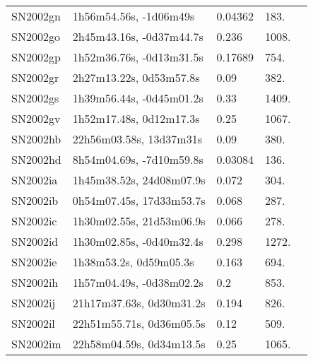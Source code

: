 \begin{longtable}{lllll}
         SN2002gn &         1h56m54.56s, -1d06m49s &  0.04362 &           183. &    \citet{2003SDSS1.C...0000:} \\
         SN2002go &       2h45m43.16s, -0d37m44.7s &    0.236 &          1008. &    \citet{2002IAUC.7994A...1M} \\
         SN2002gp &       1h52m36.76s, -0d13m31.5s &  0.17689 &           754. &    \citet{2003SDSS1.C...0000:} \\
         SN2002gr &        2h27m13.22s, 0d53m57.8s &     0.09 &           382. &    \citet{2002IAUC.7994A...1M} \\
         SN2002gs &       1h39m56.44s, -0d45m01.2s &     0.33 &          1409. &    \citet{2002IAUC.7994A...1M} \\
         SN2002gv &        1h52m17.48s, 0d12m17.3s &     0.25 &          1067. &    \citet{2002IAUC.7996C...1M} \\
         SN2002hb &        22h56m03.58s, 13d37m31s &     0.09 &           380. &    \citet{2002IAUC.8002C...1H} \\
         SN2002hd &       8h54m04.69s, -7d10m59.8s &  0.03084 &           136. &    \citet{2012ApJS..199...26H} \\
         SN2002ia &       1h45m38.52s, 24d08m07.9s &    0.072 &           304. &    \citet{2002IAUC.8027B...1H} \\
         SN2002ib &       0h54m07.45s, 17d33m53.7s &    0.068 &           287. &    \citet{2002IAUC.8027B...1H} \\
         SN2002ic &       1h30m02.55s, 21d53m06.9s &    0.066 &           278. &    \citet{2002IAUC.8028B...1H} \\
         SN2002id &       1h30m02.85s, -0d40m32.4s &    0.298 &          1272. &    \citet{2002IAUC.8020A...1M} \\
         SN2002ie &         1h38m53.2s, 0d59m05.3s &    0.163 &           694. &    \citet{2002IAUC.8020A...1M} \\
         SN2002ih &       1h57m04.49s, -0d38m02.2s &      0.2 &           853. &    \citet{2002IAUC.8020A...1M} \\
         SN2002ij &       21h17m37.63s, 0d30m31.2s &    0.194 &           826. &    \citet{2002IAUC.8020A...1M} \\
         SN2002il &       22h51m55.71s, 0d36m05.5s &     0.12 &           509. &    \citet{2002IAUC.8020A...1M} \\
         SN2002im &       22h58m04.59s, 0d34m13.5s &     0.25 &          1065. &    \citet{2002IAUC.8020A...1M} \\

\end{longtable}
